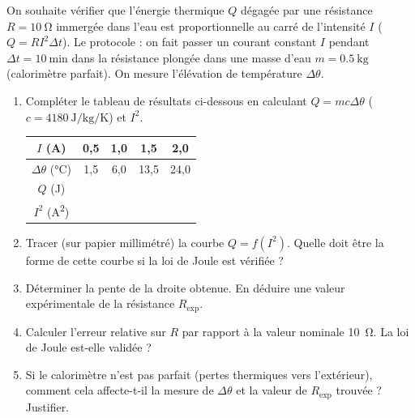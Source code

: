 \documentclass[11pt]{article}
\begin{document}
\begin{experience}
On souhaite vérifier que l'énergie thermique $Q$ dégagée par une résistance $R = \SI{10}{\ohm}$ immergée dans l'eau est proportionnelle au carré de l'intensité $I$ ($Q = R I^2 \Delta t$). Le protocole : on fait passer un courant constant $I$ pendant $\Delta t = \SI{10}{\minute}$ dans la résistance plongée dans une masse d'eau $m = \SI{0,5}{\kilogram}$ (calorimètre parfait). On mesure l'élévation de température $\Delta \theta$.
\begin{enumerate}
    \item Compléter le tableau de résultats ci-dessous en calculant $Q = m c \Delta \theta$ ($c = \SI{4180}{\joule\per\kilogram\per\kelvin}$) et $I^2$.
    \begin{center}
    \begin{tabular}{|c|c|c|c|c|}
    \hline
    $I$ (\si{\ampere}) & 0,5 & 1,0 & 1,5 & 2,0 \\ \hline
    $\Delta \theta$ (\si{\celsius}) & 1,5 & 6,0 & 13,5 & 24,0 \\ \hline
    $Q$ (\si{\joule}) & & & & \\ \hline
    $I^2$ (\si{\ampere\squared}) & & & & \\ \hline
    \end{tabular}
    \end{center}
    \item Tracer (sur papier millimétré) la courbe $Q = f(I^2)$. Quelle doit être la forme de cette courbe si la loi de Joule est vérifiée ?
    \item Déterminer la pente de la droite obtenue. En déduire une valeur expérimentale de la résistance $R_{\text{exp}}$.
    \item Calculer l'erreur relative sur $R$ par rapport à la valeur nominale \SI{10}{\ohm}. La loi de Joule est-elle validée ?
    \item Si le calorimètre n'est pas parfait (pertes thermiques vers l'extérieur), comment cela affecte-t-il la mesure de $\Delta \theta$ et la valeur de $R_{\text{exp}}$ trouvée ? Justifier.
\end{enumerate}
\end{experience}
\end{document}

